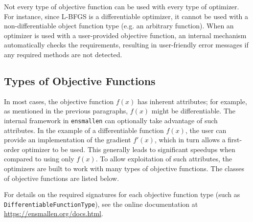 Not every type of objective function can be used with every type of optimizer.
For instance, since L-BFGS is a differentiable optimizer,
it cannot be used with a non-differentiable object function type
(e.g. an arbitrary function).
When an optimizer is used with a user-provided objective function,
an internal mechanism automatically checks the requirements,
resulting in user-friendly error messages if any required methods are not detected.


\subsection{Types of Objective Functions}

In most cases, the objective function $f(x)$ has inherent attributes;
for example, as mentioned in the previous paragraphs, $f(x)$ might be differentiable.
The internal framework in {\tt ensmallen} can optionally take advantage of such attributes.
In the example of a differentiable function $f(x)$,
the user can provide an implementation of the gradient $f'(x)$,
which in turn allows a first-order optimizer to be used.  This generally leads
to significant speedups when compared to using only $f(x)$.
To allow exploitation of such attributes, the optimizers are built to work with
many types of objective functions.  The classes of objective functions
are listed below.

For details on the required signatures for each objective function type
(such as {\tt DifferentiableFunctionType}),
see the online documentation at \mbox{\url{https://ensmallen.org/docs.html}}.

